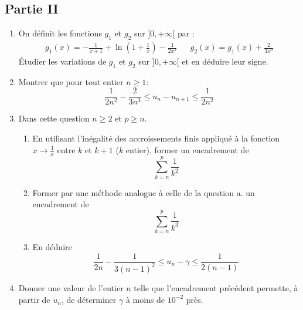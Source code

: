\subsection*{Partie II}
\begin{enumerate}
\item On définit les fonctions $g_1$ et $g_2$ sur $]0,+\infty[$ par :
\begin{align*}
g_1(x) = -\frac{1}{x+1} + \ln (1+\frac{1}{x})-\frac{1}{2x^2} & &
g_2(x) = g_1(x) + \frac{2}{3x^3}
\end{align*}
\'Etudier les variations de $g_1$ et $g_2$ sur $]0,+\infty[$ et en déduire leur signe.
\item Montrer que pour tout entier $n\geq 1$:
\[\frac{1}{2n^2}-\frac{2}{3n^3}\leq u_n - u_{n+1} \leq \frac{1}{2n^2}\] 
\item Dans cette question $n\geq2$ et $p\geq n$.
\begin{enumerate}
\item En utilisant l'inégalité des accroissements finis appliqué à la fonction $x\rightarrow \frac{1}{x}$ entre $k$ et $k+1$ ($k$ entier), former un encadrement de
\[\sum_{k=n}^{p}\frac{1}{k^2}\]
\item Former par une méthode analogue à celle de la question a. un encadrement de
\[\sum_{k=n}^{p}\frac{1}{k^3}\]
\item En déduire
\[\frac{1}{2n}-\frac{1}{3(n-1)^2} \leq u_n -\gamma \leq \frac{1}{2(n-1)}\]
\end{enumerate}
\item Donner une valeur de l'entier $n$ telle que l'encadrement précédent permette, à partir de $u_n$, de déterminer $\gamma$ à moins de $10^{-2}$ près.
\end{enumerate}
